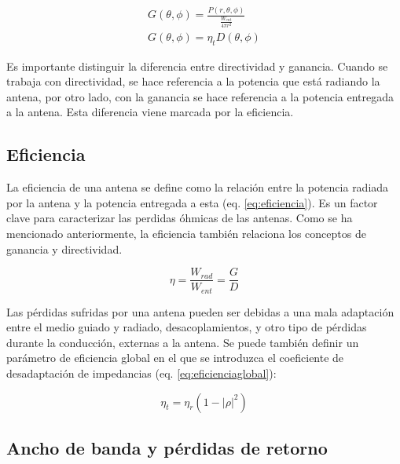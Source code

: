 \begin{subequations}
	\begin{eqnarray}
		G(\theta, \phi)=\frac{P(r,\theta, \phi)}{\frac{W_{ent}}{4\pi r^2}} \label{eq:ganancia} \\ %
		G(\theta, \phi)=\eta_{t} D(\theta, \phi) \label{eq:ganaciadirect}
	\end{eqnarray}
\end{subequations}

\par Es importante distinguir la diferencia entre directividad y ganancia. Cuando se trabaja con directividad, se hace referencia a la potencia que está radiando la antena, por otro lado, con la ganancia se hace referencia a la potencia entregada a la antena. Esta diferencia viene marcada por la eficiencia.

\subsection{Eficiencia}

\par La eficiencia de una antena se define como la relación entre la potencia radiada por la antena y la potencia entregada a esta (eq. \ref{eq:eficiencia}). Es un factor clave para caracterizar las perdidas óhmicas de las antenas. Como se ha mencionado anteriormente, la eficiencia también relaciona los conceptos de ganancia y directividad.

\begin{equation}
	\eta = \frac{W_{rad}}{W_{ent}}= \frac{G}{D}
	\label{eq:eficiencia}
\end{equation}

\par Las pérdidas sufridas por una antena pueden ser debidas a una mala adaptación entre el medio guiado y radiado, desacoplamientos, y otro tipo de pérdidas durante la conducción, externas a la antena. Se puede también definir un parámetro de eficiencia global en el que se introduzca el coeficiente de desadaptación de impedancias (eq. \ref{eq:eficienciaglobal}):

\begin{equation}
	\eta _{t}=\eta _{r}(1-\left | \rho  \right |^2)
	\label{eq:eficienciaglobal}
\end{equation}

\subsection{Ancho de banda y pérdidas de retorno}

